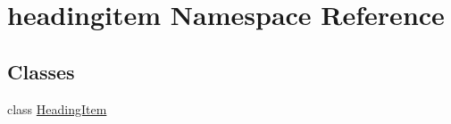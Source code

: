 \hypertarget{namespaceheadingitem}{}\section{headingitem Namespace Reference}
\label{namespaceheadingitem}
\subsection*{Classes}
\begin{DoxyCompactItemize}
\item 
class \hyperlink{classheadingitem_1_1HeadingItem}{Heading\+Item}
\end{DoxyCompactItemize}
